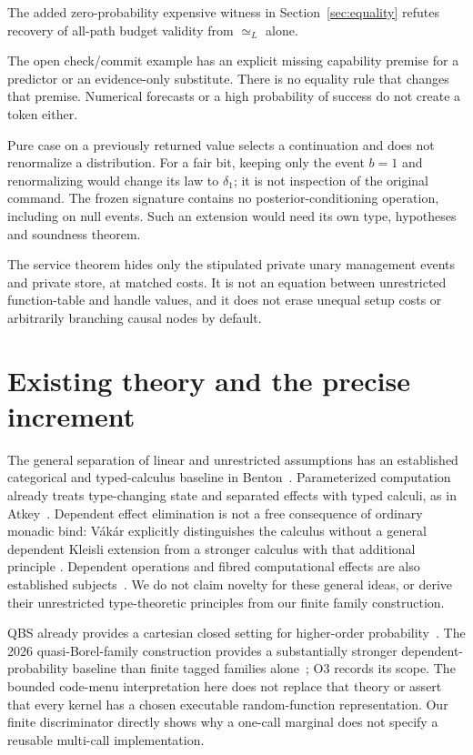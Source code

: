 \documentclass[11pt,a4paper]{article}
\theoremstyle{definition}
\begin{document}
\begin{description}
The added zero-probability expensive witness in Section~\ref{sec:equality}
refutes recovery of all-path budget validity from $\simeq_L$ alone.
\item[Evidence does not grant permissions.]
The open check/commit example has an explicit missing capability premise
for a predictor or an evidence-only substitute. There is no equality
rule that changes that premise. Numerical forecasts or a high probability
of success do not create a token either.
\item[Inspecting an observation is not conditioning.]
Pure case on a previously returned value selects a continuation and does
not renormalize a distribution. For a fair bit, keeping only the event
$b=1$ and renormalizing would change its law to $\delta_1$; it is not
inspection of the original command. The frozen signature contains no
posterior-conditioning operation, including on null events. Such an
extension would need its own type, hypotheses and soundness theorem.
\item[Implementation views must be named.]
The service theorem hides only the stipulated private unary management
events and private store, at matched costs. It is not an equation between
unrestricted function-table and handle values, and it does not erase
unequal setup costs or arbitrarily branching causal nodes by default.
\end{description}
\section{Existing theory and the precise increment}\label{sec:prior}
The general separation of linear and unrestricted assumptions has an
established categorical and typed-calculus baseline in Benton~\cite{Benton}.
Parameterized computation already treats type-changing state and separated
effects with typed calculi, as in Atkey~\cite{Atkey}. Dependent effect
elimination is not a free consequence of ordinary monadic bind: V\'{a}k\'{a}r
explicitly distinguishes the calculus without a general dependent Kleisli
extension from a stronger calculus with that additional principle
\cite{Vakar}. Dependent operations and fibred computational effects are
also established subjects~\cite{Ahman}. We do not claim novelty for these
general ideas, or derive their unrestricted type-theoretic principles from
our finite family construction.

QBS already provides a cartesian closed setting for higher-order
probability~\cite{QBS2017}. The 2026 quasi-Borel-family construction provides
a substantially stronger dependent-probability baseline than finite tagged
families alone~\cite{QBF2026}; O3 records its scope. The bounded code-menu
interpretation here does not replace that theory or assert that every
kernel has a chosen executable random-function representation. Our
finite discriminator directly shows why a one-call marginal does not
specify a reusable multi-call implementation.
\end{document}
